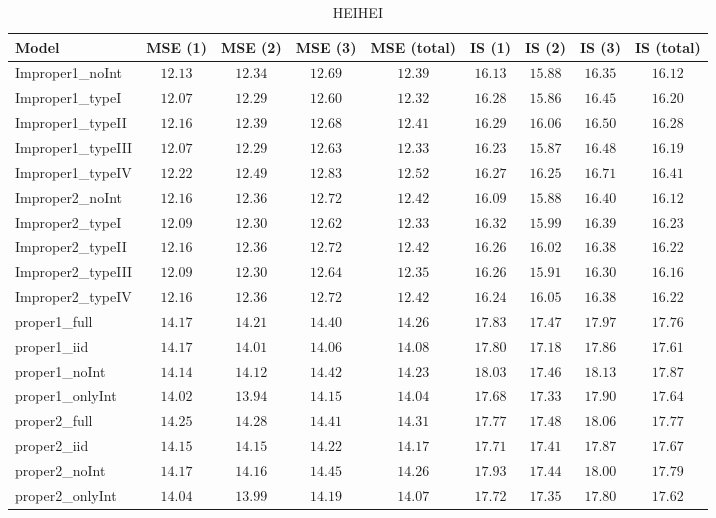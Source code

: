 \begin{table}

\caption{\label{tab:model-choice-sc9}HEIHEI}
\centering
\begin{tabular}{lcccccccc}
\hline
Model  & MSE (1) & MSE (2) & MSE (3) & MSE (total) & IS (1) & IS (2) & IS (3) & \multicolumn{1}{c}{IS (total)} \\ 
\hline
Improper1_noInt  & $12.13$ & $12.34$ & $12.69$ & $12.39$ & $16.13$ & $15.88$ & $16.35$ & $16.12$ \\
Improper1_typeI  & $12.07$ & $12.29$ & $12.60$ & $12.32$ & $16.28$ & $15.86$ & $16.45$ & $16.20$ \\
Improper1_typeII  & $12.16$ & $12.39$ & $12.68$ & $12.41$ & $16.29$ & $16.06$ & $16.50$ & $16.28$ \\
Improper1_typeIII  & $12.07$ & $12.29$ & $12.63$ & $12.33$ & $16.23$ & $15.87$ & $16.48$ & $16.19$ \\
Improper1_typeIV  & $12.22$ & $12.49$ & $12.83$ & $12.52$ & $16.27$ & $16.25$ & $16.71$ & $16.41$ \\
Improper2_noInt  & $12.16$ & $12.36$ & $12.72$ & $12.42$ & $16.09$ & $15.88$ & $16.40$ & $16.12$ \\
Improper2_typeI  & $12.09$ & $12.30$ & $12.62$ & $12.33$ & $16.32$ & $15.99$ & $16.39$ & $16.23$ \\
Improper2_typeII  & $12.16$ & $12.36$ & $12.72$ & $12.42$ & $16.26$ & $16.02$ & $16.38$ & $16.22$ \\
Improper2_typeIII  & $12.09$ & $12.30$ & $12.64$ & $12.35$ & $16.26$ & $15.91$ & $16.30$ & $16.16$ \\
Improper2_typeIV  & $12.16$ & $12.36$ & $12.72$ & $12.42$ & $16.24$ & $16.05$ & $16.38$ & $16.22$ \\
proper1_full  & $14.17$ & $14.21$ & $14.40$ & $14.26$ & $17.83$ & $17.47$ & $17.97$ & $17.76$ \\
proper1_iid  & $14.17$ & $14.01$ & $14.06$ & $14.08$ & $17.80$ & $17.18$ & $17.86$ & $17.61$ \\
proper1_noInt  & $14.14$ & $14.12$ & $14.42$ & $14.23$ & $18.03$ & $17.46$ & $18.13$ & $17.87$ \\
proper1_onlyInt  & $14.02$ & $13.94$ & $14.15$ & $14.04$ & $17.68$ & $17.33$ & $17.90$ & $17.64$ \\
proper2_full  & $14.25$ & $14.28$ & $14.41$ & $14.31$ & $17.77$ & $17.48$ & $18.06$ & $17.77$ \\
proper2_iid  & $14.15$ & $14.15$ & $14.22$ & $14.17$ & $17.71$ & $17.41$ & $17.87$ & $17.67$ \\
proper2_noInt  & $14.17$ & $14.16$ & $14.45$ & $14.26$ & $17.93$ & $17.44$ & $18.00$ & $17.79$ \\
proper2_onlyInt  & $14.04$ & $13.99$ & $14.19$ & $14.07$ & $17.72$ & $17.35$ & $17.80$ & $17.62$ \\
\hline 
\end{tabular}


\end{table}